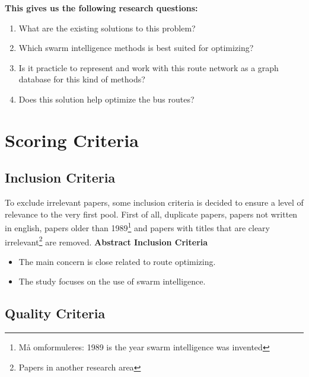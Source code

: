 \textbf{This gives us the following research questions:}
\begin{enumerate}
\item What are the existing solutions to this problem?
\item Which swarm intelligence methods is best suited for optimizing? 
\item Is it practicle to represent and work with this route network as a graph database for this kind of methods?
\item Does this solution help optimize the bus routes? 
\end{enumerate}

\section{Scoring Criteria}
\subsection{Inclusion Criteria}
To exclude irrelevant papers, some inclusion criteria is decided to ensure a level of relevance to the very first pool. First of all, duplicate papers, papers not written in english, papers older than 1989\footnote{ Må omformuleres: 1989 is the year swarm intelligence was invented} and papers with titles that are cleary irrelevant\footnote{ Papers in another research area} are removed. 
\newline
\newline
\textbf{Abstract Inclusion Criteria}
\begin{itemize}
\item The main concern is close related to route optimizing. 
\item The study focuses on the use of swarm intelligence.
\end{itemize}

\subsection{Quality Criteria}
